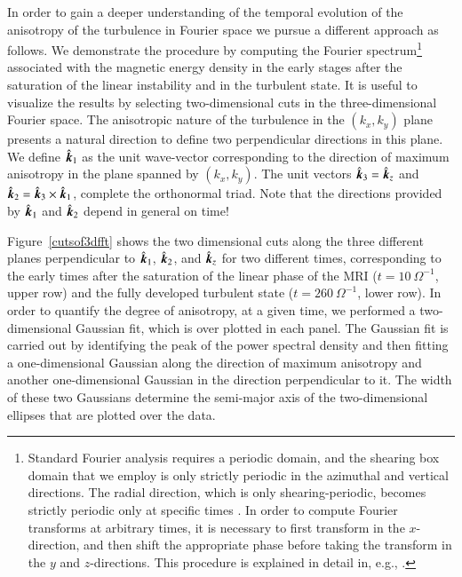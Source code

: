 \documentclass[]{emulateapj}
\newcommand\bb[1]{\mbox{\boldmath{$#1$}}}
\begin{document}
In order to gain a deeper understanding of the temporal evolution
of the anisotropy of the turbulence in Fourier space we pursue
a different approach as follows. We demonstrate the procedure by 
computing the Fourier spectrum\footnote{Standard Fourier analysis requires a periodic
domain, and the shearing box domain that we employ is only strictly
periodic in the azimuthal and vertical directions. The radial
direction, which is only shearing-periodic, becomes strictly periodic
only at specific times \citep{Hawley:1995gd}.  In order to compute
Fourier transforms at arbitrary times, it is necessary to first
transform in the $x$-direction, and then shift the appropriate phase
before taking the transform in the $y$ and $z$-directions. This
procedure is explained in detail in, e.g.,
\citet{2009MNRAS.397...52H}.
} associated with the magnetic energy 
density in the early stages after the saturation of the linear instability 
and in the turbulent state. It is useful to visualize the results by selecting 
two-dimensional cuts in the three-dimensional Fourier space.
The anisotropic nature of the turbulence in the $(k_x,k_y)$ plane presents a
natural direction to define two perpendicular directions in this plane.
We define $\hat{\bb{k}}_{1}$ as the unit wave-vector corresponding 
to the direction of maximum anisotropy in the plane spanned by $(k_x,k_y)$.
The unit vectors $\hat{\bb{k}}_{3} = \hat{\bb{k}}_{z}$ and $\hat{\bb{k}}_2 
= \hat{\bb{k}}_{3} \times \hat{\bb{k}}_{1}$,
complete the orthonormal triad.  Note that the directions provided by 
$\hat{\bb{k}}_{1}$ and $\hat{\bb{k}}_{2}$ depend in general on time!

Figure~\ref{cutsof3dfft} shows the two dimensional cuts along the
three different planes perpendicular to 
$\hat{\bb{k}}_{1}$, $\hat{\bb{k}}_{2}$, and $\hat{\bb{k}}_{z}$
for two different times, corresponding to the early times after the 
saturation of the linear phase of the MRI ($t=10~\Omega^{-1}$, upper row) 
and the fully developed turbulent state   ($t=260~\Omega^{-1}$,  lower row).
In order to quantify the degree of anisotropy, at a
given time, we performed a two-dimensional Gaussian fit, which is over
plotted in each panel.  The Gaussian fit
is carried out by identifying the peak of the power spectral density
and then fitting a one-dimensional Gaussian along the direction of
maximum anisotropy and another one-dimensional Gaussian
in the direction perpendicular to it. The width of these two Gaussians
determine the semi-major axis of the two-dimensional ellipses that are
plotted over the data.
\end{document}
